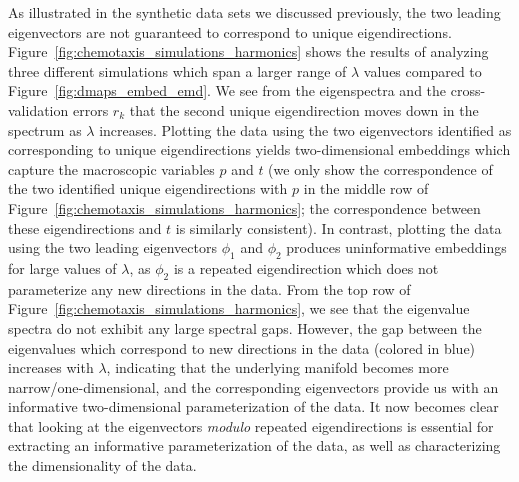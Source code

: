 \documentclass[preprint]{elsarticle}
\begin{document}
As illustrated in the synthetic data sets we discussed previously, the two leading eigenvectors are not guaranteed to correspond to unique eigendirections. 
%
Figure~\ref{fig:chemotaxis_simulations_harmonics} shows the results of analyzing three different simulations which span a larger range of $\lambda$ values compared to Figure~\ref{fig:dmaps_embed_emd}. 
%
We see from the eigenspectra and the cross-validation errors $r_k$ that the second unique eigendirection moves down in the spectrum as $\lambda$ increases. 
%
Plotting the data using the two eigenvectors identified as corresponding to unique eigendirections yields two-dimensional embeddings which capture the macroscopic variables $p$ and $t$ (we only show the correspondence of the two identified unique eigendirections with $p$ in the middle row of Figure~\ref{fig:chemotaxis_simulations_harmonics}; the correspondence between these eigendirections and $t$ is similarly consistent). 
%
In contrast, plotting the data using the two leading eigenvectors $\phi_1$ and $\phi_2$ produces uninformative embeddings for large values of $\lambda$, as $\phi_2$ is a repeated eigendirection which does not parameterize any new directions in the data.
%
From the top row of Figure~\ref{fig:chemotaxis_simulations_harmonics}, we see that the eigenvalue spectra do not exhibit any large spectral gaps.
%
However, the gap between the eigenvalues which correspond to new directions in the data (colored in blue) increases with $\lambda$, indicating that the underlying manifold becomes more narrow/one-dimensional, and the corresponding eigenvectors provide us with an informative two-dimensional parameterization of the data. %
%
It now becomes clear that looking at the eigenvectors {\em modulo} repeated eigendirections is essential for extracting an informative parameterization of the data, as well as characterizing the dimensionality of the data. 
\end{document}
